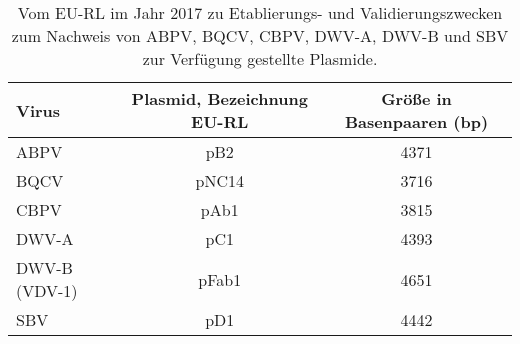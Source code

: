 \begin{table}
    \centering
    \caption{Vom EU-RL im Jahr 2017 zu Etablierungs- und Validierungszwecken zum Nachweis von ABPV, BQCV, CBPV, DWV-A, DWV-B und SBV zur Verfügung gestellte Plasmide.}
    \label{tab:c:plasmide}
    \begin{tabular}{|l|c|c|}
        \hline
        Virus   &   Plasmid, Bezeichnung EU-RL & Größe in Basenpaaren (bp)\\
        \hline
        ABPV            & pB2       & 4371\\
        BQCV            & pNC14     & 3716\\
        CBPV            & pAb1      & 3815\\
        DWV-A           & pC1       & 4393\\
        DWV-B (VDV-1)   & pFab1     & 4651\\
        SBV             & pD1       & 4442\\
        \hline
    \end{tabular}
\end{table}